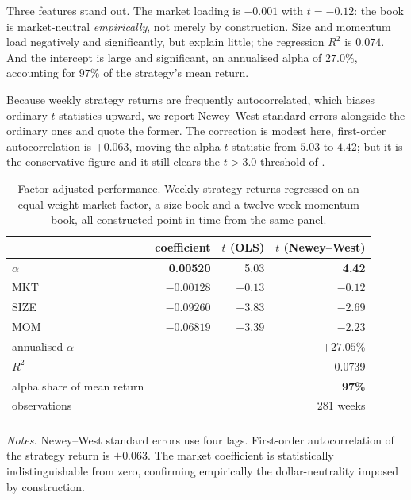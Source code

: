 \documentclass[11pt,letterpaper]{article}
\begin{document}
Three features stand out. The market loading is $-0.001$ with $t=-0.12$: the book
is market-neutral \emph{empirically}, not merely by construction. Size and
momentum load negatively and significantly, but explain little; the regression
$R^2$ is $0.074$. And the intercept is large and significant, an annualised
alpha of $27.0\%$, accounting for $97\%$ of the strategy's mean return.

Because weekly strategy returns are frequently autocorrelated, which biases
ordinary $t$-statistics upward, we report Newey--West standard errors alongside
the ordinary ones and quote the former. The correction is modest here, first-order
autocorrelation is $+0.063$, moving the alpha $t$-statistic from $5.03$ to
$4.42$; but it is the conservative figure and it still clears the $t>3.0$
threshold of \citet{harvey2016}.

\begin{table}[!htbp]\centering
\caption{Factor-adjusted performance. Weekly strategy returns regressed on an
equal-weight market factor, a size book and a twelve-week momentum book, all
constructed point-in-time from the same panel.}\label{tab:alpha}
\begin{tabular}{lrrr}
\toprule\addlinespace[2pt]
 & coefficient & $t$ (OLS) & $t$ (Newey--West) \\
\midrule\addlinespace[2pt]
$\alpha$ & \textbf{0.00520} & 5.03 & \textbf{4.42} \\
MKT      & $-0.00128$ & $-0.13$ & $-0.12$ \\
SIZE     & $-0.09260$ & $-3.83$ & $-2.69$ \\
MOM      & $-0.06819$ & $-3.39$ & $-2.23$ \\
\midrule\addlinespace[2pt]
annualised $\alpha$ & \multicolumn{3}{r}{$\mathbf{+27.05\%}$} \\
$R^{2}$ & \multicolumn{3}{r}{0.0739} \\
alpha share of mean return & \multicolumn{3}{r}{\textbf{97\%}} \\
observations & \multicolumn{3}{r}{281 weeks} \\
\addlinespace[2pt]
\bottomrule
\end{tabular}

\vspace{4pt}
\begin{minipage}{0.88\textwidth}\footnotesize
\emph{Notes.} Newey--West standard errors use four lags. First-order
autocorrelation of the strategy return is $+0.063$. The market coefficient is
statistically indistinguishable from zero, confirming empirically the
dollar-neutrality imposed by construction.
\end{minipage}
\end{table}
\end{document}
